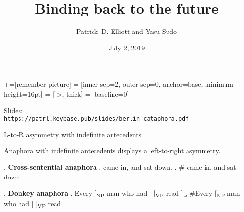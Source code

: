 \documentclass{beamer}
\title{Binding back \alert{to the future}}
\author{Patrick~D. Elliott and Yasu Sudo}
\date{July 2, 2019}
\institute{Asymmetries in Language: Presuppositions and beyond -- Berlin}
\begin{document}
\renewcommand{\Exlabelsep}{6pt}
\renewcommand{\SubExleftmargin}{18pt}

+=[remember picture]
 = [inner sep=2, outer sep=0, anchor=base, minimum height=16pt]
 = [->, thick]
 = [baseline=0]

\begin{frame}
 \maketitle
\end{frame}

\begin{frame}
  \begin{center}
    Slides:\\
    \texttt{https://patrl.keybase.pub/slides/berlin-cataphora.pdf}
  \end{center}
\end{frame}

\begin{frame}{L-to-R asymmetry with indefinite antecedents}

Anaphora with indefinite antecedents displays a left-to-right asymmetry.

\ex. {\bf Cross-sentential anaphora}\bigskip
  \a.  came in, and  sat down.
  \b. \# came in, and  sat down.

\bigskip

\ex. {\bf Donkey anaphora}
  \a. Every [\textsubscript{NP} man who had ] [\textsubscript{VP} read ]
  \b. \#Every [\textsubscript{NP} man who had ] [\textsubscript{VP} read ]



\end{frame}
\end{document}
